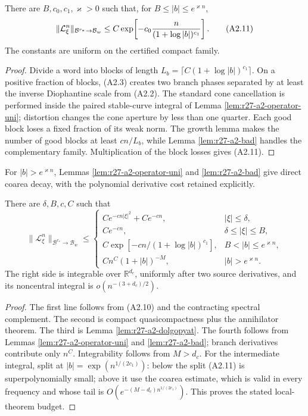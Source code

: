 \begin{lemma}
\label{lem:r27-a2-dolgopyat}
There are $B,c_0,c_1,\varkappa>0$ such that, for
$B\le|b|\le e^{\varkappa n}$,
\[
 \|\mathcal L_\xi^n\|_{\mathcal B^{r_*}\to\mathcal B_w}
 \le C\exp\!\left[-c_0{n\over(1+\log|b|)^{c_1}}\right].                  \tag{A2.11}
\]
The constants are uniform on the certified compact family.
\end{lemma}

\begin{proof}
Divide a word into blocks of length
$L_b=\lceil C(1+\log|b|)^{c_1}\rceil$.  On a positive fraction of blocks,
(A2.3) creates two branch phases separated by at least the inverse
Diophantine scale from (A2.2).  The standard cone cancellation is performed
inside the paired stable-curve integral of Lemma
\ref{lem:r27-a2-operator-uni}; distortion changes the cone aperture by less
than one quarter.  Each good block loses a fixed fraction of its weak norm.
The growth lemma makes the number of good blocks at least $cn/L_b$, while
Lemma \ref{lem:r27-a2-bad} handles the complementary family.  Multiplication
of the block losses gives (A2.11).
\end{proof}

For $|b|>e^{\varkappa n}$, Lemmas
\ref{lem:r27-a2-operator-uni} and \ref{lem:r27-a2-bad} give direct coarea
decay, with the polynomial derivative cost retained explicitly.

\begin{theorem}
\label{thm:r27-a2-fourier}
There are $\delta,B,c,C$ such that
\[
 \|\mathcal L_\xi^n\|_{\mathcal B^{r_*}\to\mathcal B_w}
 \le
 \begin{cases}
 C e^{-cn|\xi|^2}+Ce^{-cn},&|\xi|\le\delta,\\[2mm]
 Ce^{-cn},&\delta\le|\xi|\le B,\\[2mm]
 C\exp[-c n/(1+\log|b|)^{c_1}],&
       B<|b|\le e^{\varkappa n},\\[2mm]
 Cn^{C}(1+|b|)^{-M},&|b|>e^{\varkappa n}.
 \end{cases}                                             \tag{A2.12}
\]
The right side is integrable over $\mathbb R^{d_c}$, uniformly after two
source derivatives, and its noncentral integral is $o(n^{-(3+d_c)/2})$.
\end{theorem}

\begin{proof}
The first line follows from (A2.10) and the contracting spectral complement.
The second is compact quasicompactness plus the annihilator theorem.  The
third is Lemma \ref{lem:r27-a2-dolgopyat}.  The fourth follows from
Lemmas \ref{lem:r27-a2-operator-uni} and \ref{lem:r27-a2-bad}; branch
derivatives contribute only $n^C$.  Integrability follows from $M>d_c$.
For the intermediate integral, split at
$|b|=\exp(n^{1/(2c_1)})$: below the split (A2.11) is superpolynomially small;
above it use the coarea estimate, which is valid in every frequency and whose
tail is $O(e^{-(M-d_c)n^{1/(2c_1)}})$.  This proves the stated local-theorem
budget.
\end{proof}

